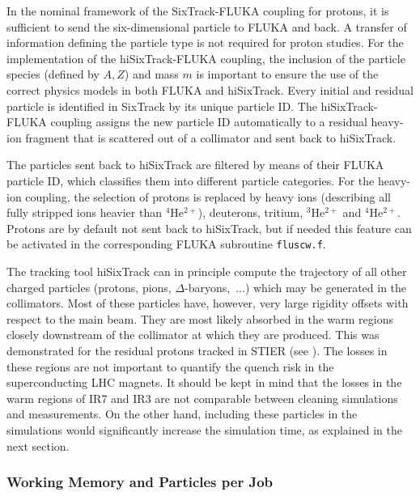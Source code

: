 In the nominal framework of the SixTrack-FLUKA coupling for protons, it is sufficient to send the six-dimensional particle to FLUKA and back. A transfer of information defining the particle type is not required for proton studies. For the implementation of the hiSixTrack-FLUKA coupling, the inclusion of the particle species (defined by $A,Z$) and mass $m$ is important to ensure the use of the correct physics models in both FLUKA and hiSixTrack. Every initial and residual particle is identified in SixTrack by its unique particle ID. The hiSixTrack-FLUKA coupling assigns the new particle ID automatically to a residual heavy-ion fragment that is scattered out of a collimator and sent back to hiSixTrack. 

The particles sent back to hiSixTrack are filtered by means of their FLUKA particle ID, which classifies them into different particle categories. For the heavy-ion coupling, the selection of protons is replaced by heavy ions (describing all fully stripped ions heavier than $^{4}$He$^{2+}$), deuterons, tritium, $^{3}$He$^{2+}$ and $^{4}$He$^{2+}$. Protons are by default not sent back to hiSixTrack, but if needed this feature can be activated  in the corresponding FLUKA subroutine \texttt{fluscw.f}. 

The tracking tool hiSixTrack can in principle compute the trajectory of all other charged particles (protons, pions, \mbox{$\Delta$-baryons, ...)} which may be generated in the collimators. Most of these particles have, however, very large rigidity offsets with respect to the main beam. They are most likely absorbed in the warm regions closely downstream of the collimator at which they are produced. This was demonstrated for the residual protons tracked in STIER (see ). The losses in these regions are not important to quantify the quench risk in the superconducting LHC magnets. It should be kept in mind that the losses in the warm regions of IR7 and IR3 are not comparable between cleaning simulations and measurements. On the other hand, including these particles in the simulations would significantly increase the simulation time, as explained in the next section.



\subsubsection{Working Memory and Particles per Job}


